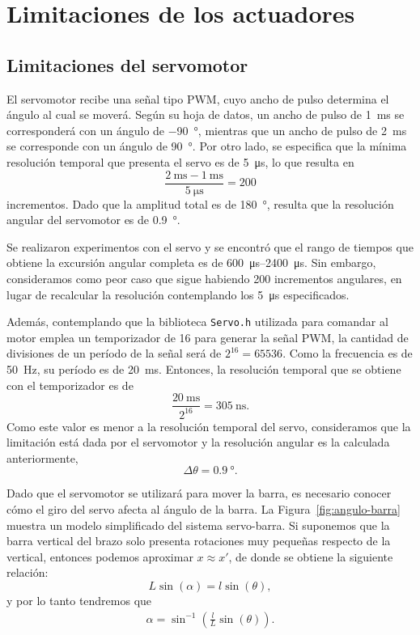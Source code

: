 \section{Limitaciones de los actuadores}

\subsection{Limitaciones del servomotor}

El servomotor recibe una señal tipo PWM, cuyo ancho de pulso determina el ángulo al cual se moverá. Según su hoja de datos, un ancho de pulso de \qty{1}{\ms} se corresponderá con un ángulo de \qty{-90}{\degree}, mientras que un ancho de pulso de \qty{2}{\ms} se corresponde con un ángulo de \qty{90}{\degree}. Por otro lado, se especifica que la mínima resolución temporal que presenta el servo es de \qty{5}{\us}, lo que resulta en
$$\frac{\qty{2}{\ms} - \qty{1}{\ms}}{\qty{5}{\us}} = 200$$
incrementos. Dado que la amplitud total es de \qty{180}{\degree}, resulta que la resolución angular del servomotor es de \qty{0.9}{\degree}.

Se realizaron experimentos con el servo y se encontró que el rango de tiempos que obtiene la excursión angular completa es de \qtyrange{600}{2400}{\us}. Sin embargo, consideramos como peor caso que sigue habiendo 200 incrementos angulares, en lugar de recalcular la resolución contemplando los \qty{5}{\us} especificados.

Además, contemplando que la biblioteca \verb|Servo.h| utilizada para comandar al motor emplea un temporizador de \qty{16}{\bit} para generar la señal PWM, la cantidad de divisiones de un período de la señal será de $2^{16} = 65536$. Como la frecuencia es de \qty{50}{\Hz}, su período es de \qty{20}{\ms}. Entonces, la resolución temporal que se obtiene con el temporizador es de
$$\frac{\qty{20}{\ms}}{2^{16}} = \qty{305}{\ns}.$$
Como este valor es menor a la resolución temporal del servo, consideramos que la limitación está dada por el servomotor y la resolución angular es la calculada anteriormente,
$$\Delta\theta = \qty{0.9}{\degree}.$$

Dado que el servomotor se utilizará para mover la barra, es necesario conocer cómo el giro del servo afecta al ángulo de la barra. La Figura~\ref{fig:angulo-barra} muestra un modelo simplificado del sistema servo-barra. Si suponemos que la barra vertical del brazo solo presenta rotaciones muy pequeñas respecto de la vertical, entonces podemos aproximar $x \approx x'$, de donde se obtiene la siguiente relación:
$$L \sin(\alpha) = l \sin(\theta),$$
y por lo tanto tendremos que
\begin{align*}
    \alpha = \sin^{-1}\left(\frac{l}{L} \sin(\theta)\right).
\end{align*}

